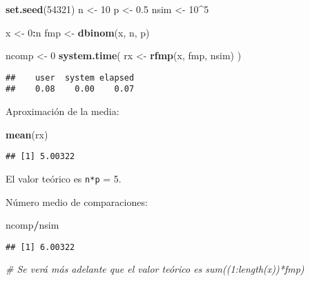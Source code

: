 \documentclass[
]{book}
\newenvironment{Shaded}{\begin{snugshade}}{\end{snugshade}}
\newcommand{\CommentTok}[1]{\textcolor[rgb]{0.56,0.35,0.01}{\textit{#1}}}
\newcommand{\DecValTok}[1]{\textcolor[rgb]{0.00,0.00,0.81}{#1}}
\newcommand{\FloatTok}[1]{\textcolor[rgb]{0.00,0.00,0.81}{#1}}
\newcommand{\KeywordTok}[1]{\textcolor[rgb]{0.13,0.29,0.53}{\textbf{#1}}}
\newcommand{\NormalTok}[1]{#1}
\newcommand{\OperatorTok}[1]{\textcolor[rgb]{0.81,0.36,0.00}{\textbf{#1}}}
\newcommand{\StringTok}[1]{\textcolor[rgb]{0.31,0.60,0.02}{#1}}
\theoremstyle{break}
\theoremstyle{definition}
\theoremstyle{definition}
\theoremstyle{definition}
\theoremstyle{remark}
\begin{document}
\begin{Shaded}
\begin{Highlighting}[]
\KeywordTok{set.seed}\NormalTok{(}\DecValTok{54321}\NormalTok{)}
\NormalTok{n <-}\StringTok{ }\DecValTok{10}
\NormalTok{p <-}\StringTok{ }\FloatTok{0.5}
\NormalTok{nsim <-}\StringTok{ }\DecValTok{10}\OperatorTok{^}\DecValTok{5}

\NormalTok{x <-}\StringTok{ }\DecValTok{0}\OperatorTok{:}\NormalTok{n}
\NormalTok{fmp <-}\StringTok{ }\KeywordTok{dbinom}\NormalTok{(x, n, p)}

\NormalTok{ncomp <-}\StringTok{ }\DecValTok{0}
\KeywordTok{system.time}\NormalTok{( rx <-}\StringTok{ }\KeywordTok{rfmp}\NormalTok{(x, fmp, nsim) )}
\end{Highlighting}
\end{Shaded}

\begin{verbatim}
##    user  system elapsed 
##    0.08    0.00    0.07
\end{verbatim}

Aproximación de la media:

\begin{Shaded}
\begin{Highlighting}[]
\KeywordTok{mean}\NormalTok{(rx)}
\end{Highlighting}
\end{Shaded}

\begin{verbatim}
## [1] 5.00322
\end{verbatim}

El valor teórico es \texttt{n*p} = 5.

Número medio de comparaciones:

\begin{Shaded}
\begin{Highlighting}[]
\NormalTok{ncomp}\OperatorTok{/}\NormalTok{nsim}
\end{Highlighting}
\end{Shaded}

\begin{verbatim}
## [1] 6.00322
\end{verbatim}

\begin{Shaded}
\begin{Highlighting}[]
\CommentTok{# Se verá más adelante que el valor teórico es sum((1:length(x))*fmp)}
\end{Highlighting}
\end{Shaded}
\end{document}
